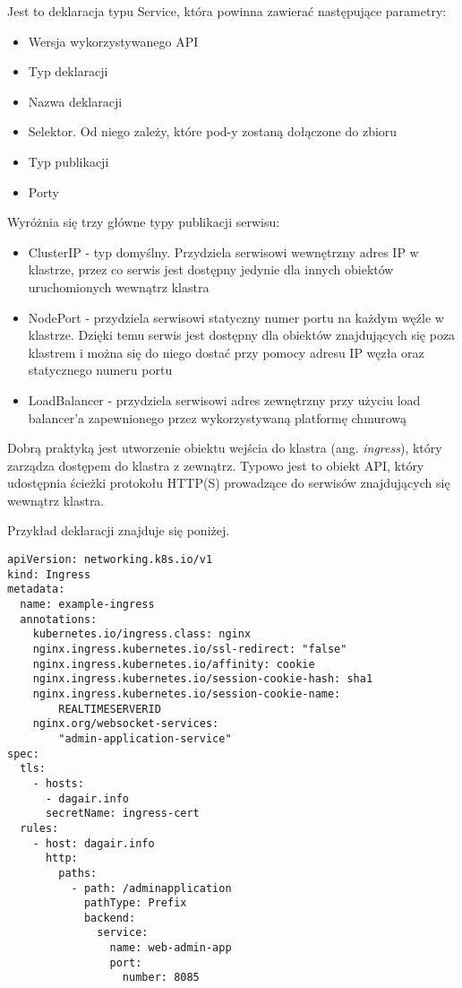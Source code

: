 Jest to deklaracja typu Service, która powinna zawierać następujące parametry:

\begin{itemize} %
    \item Wersja wykorzystywanego API
    \item Typ deklaracji
    \item Nazwa deklaracji
    \item Selektor. Od niego zależy, które pod-y zostaną dołączone do zbioru
    \item Typ publikacji
    \item Porty
\end{itemize}

Wyróżnia się trzy główne typy publikacji serwisu:

\begin{itemize} %
    \item ClusterIP - typ domyślny. Przydziela serwisowi wewnętrzny adres IP 
    w klastrze, przez co serwis jest dostępny jedynie dla innych obiektów uruchomionych 
    wewnątrz klastra
    \item NodePort - przydziela serwisowi statyczny numer portu na każdym węźle 
    w klastrze. Dzięki temu serwis jest dostępny dla obiektów znajdujących się poza 
    klastrem i można się do niego dostać przy pomocy adresu IP węzła oraz statycznego 
    numeru portu
    \item LoadBalancer - przydziela serwisowi adres zewnętrzny przy użyciu load 
    balancer'a zapewnionego przez wykorzystywaną platformę chmurową
\end{itemize}

Dobrą praktyką jest utworzenie obiektu wejścia do klastra (ang. \textit{ingress}), który 
zarządza dostępem do klastra z zewnątrz. Typowo jest to obiekt API, który udostępnia 
ścieżki protokołu HTTP(S) prowadzące do serwisów znajdujących się wewnątrz klastra.

Przykład deklaracji znajduje się poniżej.

\begin{lstlisting}
apiVersion: networking.k8s.io/v1
kind: Ingress
metadata:
  name: example-ingress
  annotations:
    kubernetes.io/ingress.class: nginx
    nginx.ingress.kubernetes.io/ssl-redirect: "false"
    nginx.ingress.kubernetes.io/affinity: cookie
    nginx.ingress.kubernetes.io/session-cookie-hash: sha1
    nginx.ingress.kubernetes.io/session-cookie-name: 
        REALTIMESERVERID
    nginx.org/websocket-services: 
        "admin-application-service"
spec:
  tls:
    - hosts:
      - dagair.info
      secretName: ingress-cert
  rules:
    - host: dagair.info
      http:
        paths:
          - path: /adminapplication
            pathType: Prefix
            backend:
              service:
                name: web-admin-app
                port:
                  number: 8085
\end{lstlisting}

